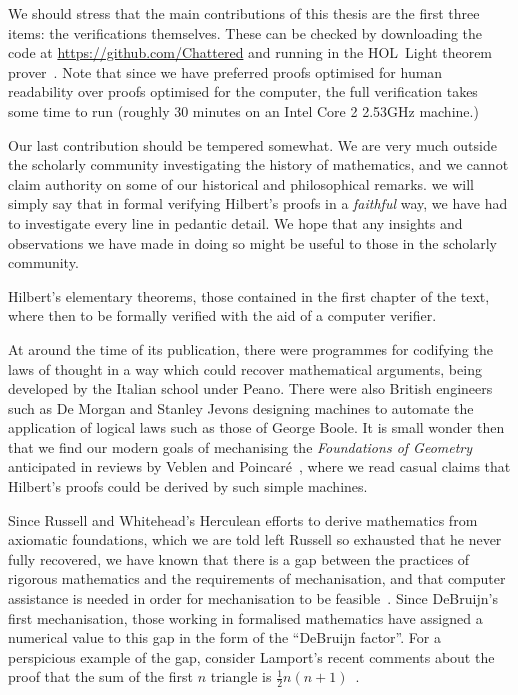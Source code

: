 We should stress that the main contributions of this thesis are the first three items: the verifications themselves. These can be checked by downloading the code at \url{https://github.com/Chattered} and running in the HOL~Light theorem prover~\cite{HOLLight}. Note that since we have preferred proofs optimised for human readability over proofs optimised for the computer, the full verification takes some time to run (roughly 30 minutes on an Intel Core 2 2.53GHz machine.)

Our last contribution should be tempered somewhat. We are very much outside the scholarly community investigating the history of mathematics, and we cannot claim authority on some of our historical and philosophical remarks. we will simply say that in formal verifying Hilbert's proofs in a \emph{faithful} way, we have had to investigate every line in pedantic detail. We hope that any insights and observations we have made in doing so might be useful to those in the scholarly community.

Hilbert's elementary theorems, those contained in the first chapter of the text, where then to be formally verified with the aid of a computer verifier. 

At around the time of its publication, there were programmes for codifying the laws of thought in a way which could recover mathematical arguments, being developed by the Italian school under Peano. There were also British engineers such as De Morgan and Stanley Jevons designing machines to automate the application of logical laws such as those of George Boole. It is small wonder then that we find our modern goals of mechanising the \emph{Foundations of Geometry} anticipated in reviews by Veblen and Poincar\'{e}~\cite{VeblenHilbertReview,PoincareReview}, where we read casual claims that Hilbert's proofs could be derived by such simple machines.

Since Russell and Whitehead's Herculean efforts to derive mathematics from axiomatic foundations, which we are told left Russell so exhausted that he never fully recovered, we have known that there is a gap between the practices of rigorous mathematics and the requirements of mechanisation, and that computer assistance is needed in order for mechanisation to be feasible~\cite{FormalizedMathematics}. Since DeBruijn's first mechanisation, those working in formalised mathematics have assigned a numerical value to this gap in the form of the ``DeBruijn factor''. For a perspicious example of the gap, consider Lamport's recent comments about the proof that the sum of the first $n$ triangle is $\tfrac{1}{2}n(n+1)$~\cite{ProofMessageCertificate}.

